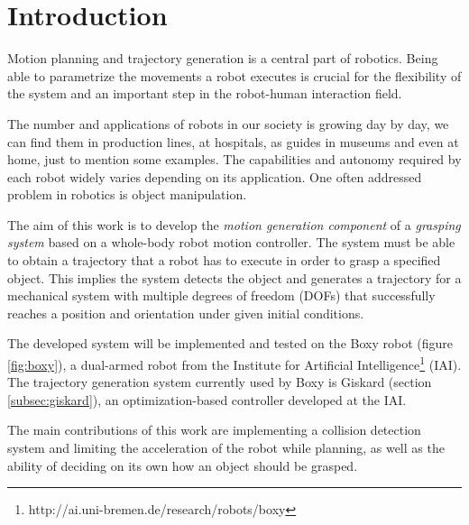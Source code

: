 

\chapter{\textbf{Introduction}}

Motion planning and trajectory generation is a central part of robotics. Being able to parametrize the movements a robot executes is crucial for the flexibility of the system and an important step in the robot-human interaction field.

The number and applications of robots in our society is growing day by day, we can find them in production lines, at hospitals, as guides in museums and even at home, just to mention some examples. The capabilities and autonomy required by each robot widely varies depending on its application. One often addressed problem in robotics is object manipulation.

The aim of this work is to develop the \textit{motion generation component} of a \textit{grasping system} based on a whole-body robot motion controller. The system must be able to obtain a trajectory that a robot has to execute in order to grasp a specified object. This implies the system detects the object and generates a trajectory for a mechanical system with multiple degrees of freedom (DOFs) that successfully reaches a position and orientation under given initial conditions.

The developed system will be implemented and tested on the Boxy robot (figure \ref{fig:boxy}), a dual-armed robot from the Institute for Artificial Intelligence\footnote{http://ai.uni-bremen.de/research/robots/boxy} (IAI). The trajectory generation system currently used by Boxy is Giskard (section \ref{subsec:giskard}), an optimization-based controller developed at the IAI. 

The main contributions of this work are implementing a collision detection system and limiting the acceleration of the robot while planning, as well as the ability of deciding on its own how an object should be grasped.


